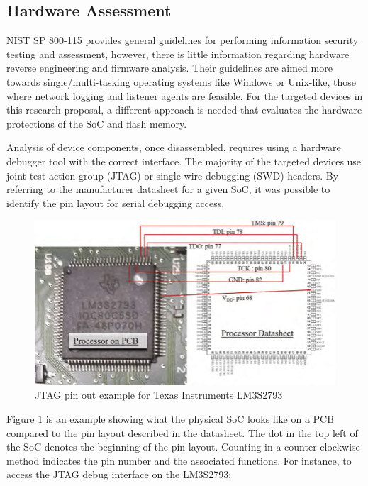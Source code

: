 \subsection{Hardware Assessment} \label{hardwareassessment}

NIST SP 800-115 \autocite{NISTSP8001152020} provides general guidelines for performing information security testing and assessment, however, there is little information regarding hardware reverse engineering and firmware analysis. Their guidelines are aimed more towards single/multi-tasking operating systems like Windows or Unix-like, those where network logging and listener agents are feasible. For the targeted devices in this research proposal, a different approach is needed that evaluates the hardware protections of the SoC and flash memory. 

Analysis of device components, once disassembled, requires using a hardware debugger tool with the correct interface. The majority of the targeted devices use joint test action group (JTAG) or single wire debugging (SWD) headers. By referring to the manufacturer datasheet for a given SoC, it was possible to identify the pin layout for serial debugging access.

\begin{figure}[ht]%
  \centering
  \includegraphics[keepaspectratio]{Figures/JTAGExample.png}
  \caption{JTAG pin out example for Texas Instruments LM3S2793}%
  \label{fig:jtag_pinout}%
\end{figure}

Figure \ref{fig:jtag_pinout} is an example showing what the physical SoC looks like on a PCB compared to the pin layout described in the datasheet. The dot in the top left of the SoC denotes the beginning of the pin layout. Counting in a counter-clockwise method indicates the pin number and the associated functions. For instance, to access the JTAG debug interface on the LM3S2793:

